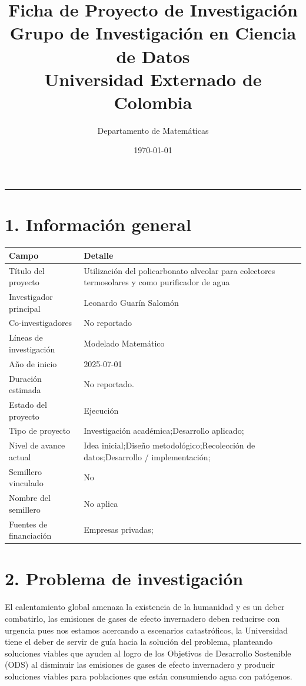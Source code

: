 \documentclass[a4paper,12pt]{article}
\title{
\vspace{-8mm}
\textbf{\textcolor{ExternadoGreen}{Ficha de Proyecto de Investigación}}\\
\large \textcolor{ExternadoDark}{Grupo de Investigación en Ciencia de Datos}\\
\large \textcolor{ExternadoDark}{Universidad Externado de Colombia}
}
\author{\textcolor{ExternadoDark}{Departamento de Matemáticas}}
\date{\textcolor{ExternadoDark}{\today}}
\begin{document}
\maketitle
\vspace{-3mm}
\noindent\textcolor{ExternadoDark}{\rule{\textwidth}{0.6pt}}

\section*{1. Información general}
\begin{longtable}{p{4.2cm} p{10.4cm}}
\toprule
\textbf{Campo} & \textbf{Detalle} \\
\midrule
Título del proyecto & Utilización del policarbonato alveolar para colectores termosolares y como purificador de agua \\
Investigador principal & Leonardo Guarín Salomón \\
Co-investigadores & No reportado \\
Líneas de investigación & Modelado Matemático \\
Año de inicio & 2025-07-01 \\
Duración estimada & No reportado. \\
Estado del proyecto & Ejecución \\
Tipo de proyecto & Investigación académica;Desarrollo aplicado; \\
Nivel de avance actual & Idea inicial;Diseño metodológico;Recolección de datos;Desarrollo / implementación; \\
Semillero vinculado & No \\
Nombre del semillero & No aplica \\
Fuentes de financiación & Empresas privadas; \\
\bottomrule
\end{longtable}

\section*{2. Problema de investigación}
El calentamiento global amenaza la existencia de la humanidad y es un deber combatirlo, las emisiones de gases de efecto invernadero deben reducirse con urgencia pues nos estamos acercando a escenarios catastróficos, la Universidad tiene el deber de servir de guía hacia la solución del problema, planteando soluciones viables que ayuden al logro de los Objetivos de Desarrollo Sostenible (ODS) al disminuir las emisiones de gases de efecto invernadero y producir soluciones viables para poblaciones que están consumiendo agua con patógenos.
\end{document}
